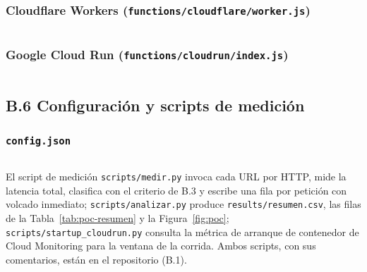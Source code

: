 \subsubsection*{Cloudflare Workers (\texttt{functions/cloudflare/worker.js})}
\inputminted[fontsize=\scriptsize, breaklines]{javascript}{assets/code/cloudflare-worker.js}

\subsubsection*{Google Cloud Run (\texttt{functions/cloudrun/index.js})}
\inputminted[fontsize=\scriptsize, breaklines]{javascript}{assets/code/cloudrun-index.js}

\subsection*{B.6 Configuración y scripts de medición}

\subsubsection*{\texttt{config.json}}
\inputminted[fontsize=\scriptsize, breaklines]{json}{assets/code/config.json}


El script de medición \texttt{scripts/medir.py} invoca cada URL por HTTP, mide la
latencia total, clasifica con el criterio de B.3 y escribe una fila por petición
con volcado inmediato; \texttt{scripts/analizar.py} produce
\texttt{results/resumen.csv}, las filas de la Tabla~\ref{tab:poc-resumen} y la
Figura~\ref{fig:poc}; \texttt{scripts/startup\_cloudrun.py} consulta la métrica de
arranque de contenedor de Cloud Monitoring para la ventana de la corrida. Ambos
scripts, con sus comentarios, están en el repositorio (B.1).

\clearpage
